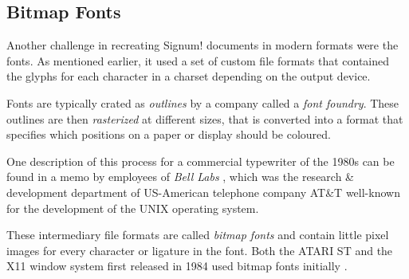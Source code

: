 \subsection{Bitmap Fonts}

Another challenge in recreating Signum! documents in modern formats were the fonts. As mentioned earlier, it used a set of custom file formats that contained the glyphs for each character in a charset depending on the output device.

Fonts are typically crated as \textit{outlines} by a company called a \textit{font foundry}. These outlines are then \textit{rasterized} at different sizes, that is converted into a format that specifies which positions on a paper or display should be coloured.

One description of this process for a commercial typewriter of the 1980s can be found in a memo by employees of \textit{Bell Labs} \cite[Page 7]{bwk1980summer}, which was the research \& development department of US-American telephone company AT\&T well-known for the development of the UNIX operating system.

These intermediary file formats are called \textit{bitmap fonts} and contain little pixel images for every character or ligature in the font. Both the ATARI ST and the X11 window system first released in 1984 used bitmap fonts initially \cite{tosVDIfontHdr} \cite{ffPCFFormat}.

